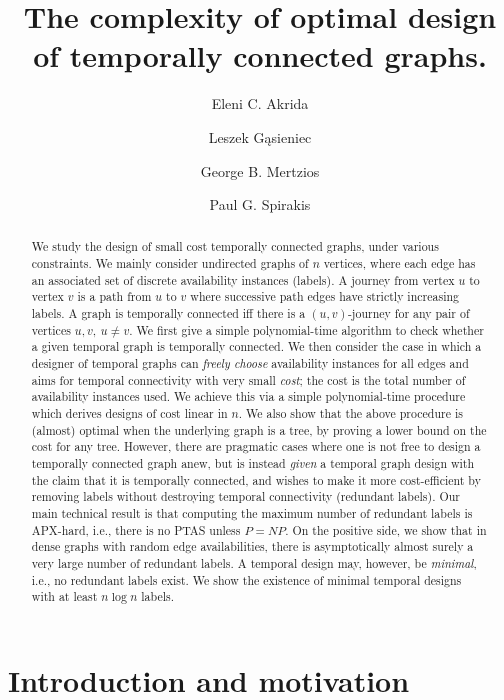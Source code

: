 \documentclass[a4paper,UKenglish]{article}
\title{The complexity of optimal design of temporally connected graphs.}
\author[1]{Eleni C. Akrida}
\author[1]{Leszek G\k{a}sieniec}
\author[2]{George B. Mertzios}
\author[1]{Paul G. Spirakis}
\affil[1]{Department of Computer Science, University of Liverpool, UK\\
  \texttt{\{Eleni.Akrida,L.A.Gasieniec,P.Spirakis\}@liverpool.ac.uk}}
\affil[2]{School of Engineering and Computing Sciences, Durham University, UK\\
  \texttt{George.Mertzios@durham.ac.uk}}
\begin{document}
\maketitle

\begin{abstract}
We study the design of small cost temporally connected graphs, under various constraints. We mainly consider undirected graphs of $n$ vertices, where each edge has an associated set of discrete availability instances (labels). A journey from vertex $u$ to vertex $v$ is a path from $u$ to $v$ where successive path edges have strictly increasing labels. A graph is temporally connected iff there is a $(u,v)$-journey for any pair of vertices $u,v,~u\not= v$. We first give a simple polynomial-time algorithm to check whether a given temporal graph is temporally connected. We then consider the case in which a designer of temporal graphs can \emph{freely choose} availability instances for all edges and aims for temporal connectivity with very small \emph{cost}; the cost is the total number of availability instances used. We achieve this via a simple polynomial-time procedure which derives designs of cost linear in $n$. We also show that the above procedure is (almost) optimal when the underlying graph is a tree, by proving a lower bound on the cost for any tree. However, there are pragmatic cases where one is not free to design a temporally connected graph anew, but is instead \emph{given} a temporal graph design with the claim that it is temporally connected, and wishes to make it more cost-efficient by removing labels without destroying temporal connectivity (redundant  labels).
Our main technical result is that computing the maximum number of redundant labels is APX-hard, i.e., there is no PTAS unless $P=NP$. On the positive side, we show that in dense graphs with random edge availabilities, there is asymptotically almost surely a very large number of  redundant labels. A temporal design may, however, be \emph{minimal}, i.e., no redundant labels exist. We show the existence of minimal temporal designs with at least $n \log{n}$ labels.
\end{abstract}

\section{Introduction and motivation}
\end{document}
